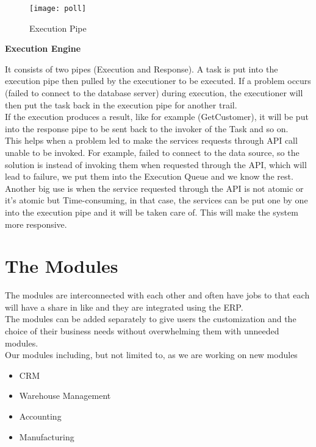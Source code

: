 \begin{adjustwidth}{2cm}{}
\begin{adjustwidth}{1cm}{}
\begin{itemize}
\end{itemize}

\begin{figure}
    \texttt{[image: poll]}
    \centering
    \caption{Execution Pipe}
    \label{fig:poll}
\end{figure}

    \end{adjustwidth}

    \textbf{Execution Engine}\\
    \begin{adjustwidth}{1cm}{}
        It consists of two pipes (Execution and Response). A task is put into the execution pipe then
pulled by the executioner to be executed. If a problem occurs (failed to connect to the
database server) during execution, the executioner will then put the task back in the execution
pipe for another trail.\\
If the execution produces a result, like for example (GetCustomer), it will be put into the
response pipe to be sent back to the invoker of the Task and so on.\\
This helps when a problem led to make the services requests through API call unable to be
invoked. For example, failed to connect to the data source, so the solution is instead of
invoking them when requested through the API, which will lead to failure, we put them into
the Execution Queue and we know the rest.\\
Another big use is when the service requested through the API is not atomic or it’s atomic but
Time-consuming, in that case, the services can be put one by one into the execution pipe and
it will be taken care of. This will make the system more responsive.
    \end{adjustwidth}
        
        
    
    
\end{adjustwidth}

\section{The Modules}

The modules are interconnected with each other and often have jobs to that each will have a share in
like and they are integrated using the ERP.\\
The modules can be added separately to give users the customization and the choice of their business
needs without overwhelming them with unneeded modules.\\
Our modules including, but not limited to, as we are working on new modules
\begin{itemize}
    \item CRM
    \item Warehouse Management
    \item Accounting
    \item Manufacturing
\end{itemize}

